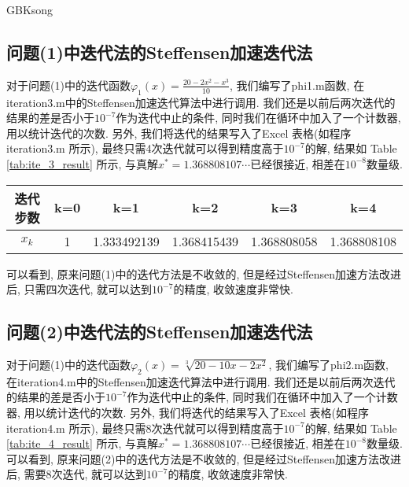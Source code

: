\documentclass[a4paper]{article}
\begin{document}
\begin{CJK*}{GBK}{song}
\subsection{问题(1)中迭代法的Steffensen加速迭代法}
对于问题(1)中的迭代函数$\varphi_1(x)=\frac{20-2x^2-x^3}{10}$, 我们编写了phi1.m函数, 在iteration3.m中的Steffensen加速迭代算法中进行调用. 我们还是以前后两次迭代的结果的差是否小于$10^{-7}$作为迭代中止的条件, 同时我们在循环中加入了一个计数器, 用以统计迭代的次数. 另外, 我们将迭代的结果写入了Excel 表格(如程序iteration3.m 所示), 最终只需4次迭代就可以得到精度高于$10^{-7}$的解, 结果如 Table
\ref{tab:ite_3_result} 所示, 与真解$x^*=1.368808107\cdots$已经很接近, 相差在$10^{-8}$数量级.

\begin{table*}[!htbp]
\centering
\begin{threeparttable}[!htpb]
 \caption{\label{tab:ite_3_result}采用问题(1)中的迭代方法采用Steffensen加速法后的迭代结果}
 \begin{tabular}{ccccc c}
 \toprule
 迭代步数 &k=0 & k=1	&k=2	&	k=3	&	k=4	\\ \hline
$x_k$ &1&1.333492139	&1.368415439	&1.368808058	&1.368808108\\
\bottomrule
\end{tabular}
\end{threeparttable}%
\end{table*}

可以看到, 原来问题(1)中的迭代方法是不收敛的, 但是经过Steffensen加速方法改进后, 只需四次迭代, 就可以达到$10^{-7}$的精度, 收敛速度非常快.


\subsection{问题(2)中迭代法的Steffensen加速迭代法}
对于问题(1)中的迭代函数$\varphi_2(x)=\sqrt[3]{20-10x-2x^2}$, 我们编写了phi2.m函数, 在iteration4.m中的Steffensen加速迭代算法中进行调用. 我们还是以前后两次迭代的结果的差是否小于$10^{-7}$作为迭代中止的条件, 同时我们在循环中加入了一个计数器, 用以统计迭代的次数. 另外, 我们将迭代的结果写入了Excel 表格(如程序iteration4.m 所示), 最终只需8次迭代就可以得到精度高于$10^{-7}$的解, 结果如 Table
\ref{tab:ite_4_result} 所示, 与真解$x^*=1.368808107\cdots$已经很接近, 相差在$10^{-8}$数量级.可以看到, 原来问题(2)中的迭代方法是不收敛的, 但是经过Steffensen加速方法改进后, 需要8次迭代, 就可以达到$10^{-7}$的精度, 收敛速度非常快.


\end{CJK*}
\end{document}
